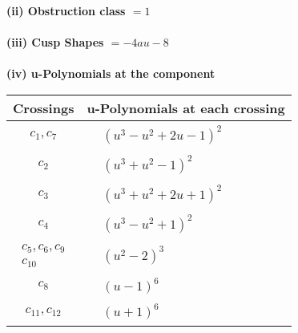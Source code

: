 \documentclass[1p]{elsarticle_modified}
\theoremstyle{definition}
\begin{document}
\flushleft \textbf{(ii) Obstruction class $= 1$}\\~\\
\flushleft \textbf{(iii) Cusp Shapes $= -4 a u-8$}\\~\\
\newpage\renewcommand{\arraystretch}{1}
\flushleft \textbf{(iv) u-Polynomials at the component}\newline \\
\begin{tabular}{m{50pt}|m{274pt}}
Crossings & \hspace{64pt}u-Polynomials at each crossing \\
\hline $$\begin{aligned}c_{1},c_{7}\end{aligned}$$&$\begin{aligned}
&(u^3- u^2+2 u-1)^2
\end{aligned}$\\
\hline $$\begin{aligned}c_{2}\end{aligned}$$&$\begin{aligned}
&(u^3+u^2-1)^2
\end{aligned}$\\
\hline $$\begin{aligned}c_{3}\end{aligned}$$&$\begin{aligned}
&(u^3+u^2+2 u+1)^2
\end{aligned}$\\
\hline $$\begin{aligned}c_{4}\end{aligned}$$&$\begin{aligned}
&(u^3- u^2+1)^2
\end{aligned}$\\
\hline $$\begin{aligned}c_{5},c_{6},c_{9}\\c_{10}\end{aligned}$$&$\begin{aligned}
&(u^2-2)^3
\end{aligned}$\\
\hline $$\begin{aligned}c_{8}\end{aligned}$$&$\begin{aligned}
&(u-1)^6
\end{aligned}$\\
\hline $$\begin{aligned}c_{11},c_{12}\end{aligned}$$&$\begin{aligned}
&(u+1)^6
\end{aligned}$\\
\hline
\end{tabular}\\~\\
\end{document}
